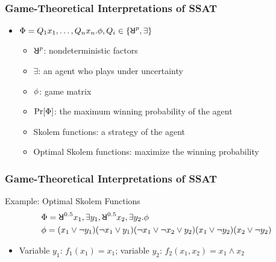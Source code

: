 \begin{frame}
      \frametitle{Game-Theoretical Interpretations of SSAT}
      \begin{itemize}
            \item $\Qf=Q_1 x_1,\ldots,Q_n x_n.\pf,Q_i\in\{\random{p},\exists\}$
                  \begin{itemize}
                        \item $\random{p}$: nondeterministic factors
                        \item $\exists$: an agent who plays under uncertainty
                        \item $\phi$: game matrix
                        \item $\Pr[\Phi]$: the maximum winning probability of the agent
                        \item \alert{Skolem functions}: a strategy of the agent
                        \item \alert{Optimal Skolem functions}: maximize the winning probability
                  \end{itemize}
      \end{itemize}
\end{frame}

\begin{frame}
      \frametitle{Game-Theoretical Interpretations of SSAT}
      \begin{block}{Example: Optimal Skolem Functions}
            \abovedisplayskip=0pt
            \belowdisplayskip=0pt
            \begin{align*}
                   & \Qf=\random{0.5} x_1, \exists y_1, \random{0.5} x_2, \exists y_2. \pf \\
                   & \pf=(x_1 \lor \lnot y_1)
                  (\lnot x_1 \lor y_1)
                  (\lnot x_1 \lor \lnot x_2 \lor y_2)
                  (x_1 \lor \lnot y_2)
                  (x_2 \lor \lnot y_2)
            \end{align*}
            \begin{itemize}
                  \item Variable $y_1$: $f_1(x_1)=x_1$; variable $y_2$: $f_2(x_1,x_2)=x_1 \land x_2$
            \end{itemize}
      \end{block}
\end{frame}